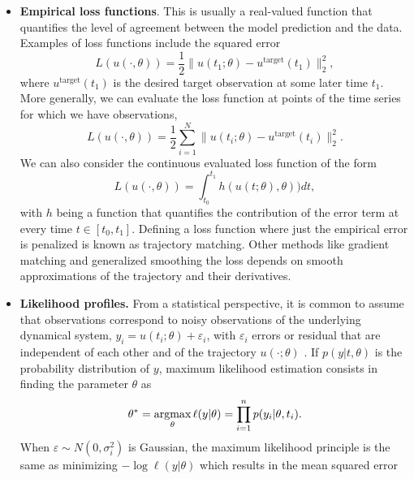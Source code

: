 \begin{itemize}
    \item \textbf{Empirical loss functions}. This is usually a real-valued function that quantifies the level of agreement between the model prediction and the data. Examples of loss functions include the squared error
    \begin{equation}
         L(u(\cdot, \theta)) = \frac{1}{2} \| u(t_1; \theta) - u^{\text{target}}(t_1) \|_2^2,
         \label{eq:quadratic-loss-function}
    \end{equation}
    where $u^{\text{target}}(t_1)$ is the desired target observation at some later time $t_1$.
    More generally, we can evaluate the loss function at points of the time series for which we have observations, 
    \begin{equation}
        L(u(\cdot, \theta)) = \frac{1}{2} \sum_{i=1}^N \| u(t_i; \theta) - u^{\text{target}}(t_i) \|_2^2.
    \end{equation}
    We can also consider the continuous evaluated loss function of the form
    \begin{equation}
         L(u(\cdot, \theta)) = \int_{t_0}^{t_1} h( u(t;\theta), \theta) ) dt, 
    \end{equation}
    with $h$ being a function that quantifies the contribution of the error term at every time $t \in [t_0, t_1]$. 
    Defining a loss function where just the empirical error is penalized is known as trajectory matching. 
    Other methods like gradient matching and generalized smoothing the loss depends on smooth approximations of the trajectory and their derivatives. 
    \item \textbf{Likelihood profiles.} From a statistical perspective, it is common to assume that observations correspond to noisy observations of the underlying dynamical system, $y_i = u(t_i; \theta) + \varepsilon_i$, with $\varepsilon_i$ errors or residual that are independent of each other and of the trajectory $u(\cdot ; \theta)$ \cite{ramsay2017dynamic}.
    If $p(y | t , \theta)$ is the probability distribution of $y$, maximum likelihood estimation consists in finding the parameter $\theta$ as
    \begin{equation}
        \theta^* 
        = 
        \underset{\theta}{\text{argmax}} \, \ell (y | \theta) 
        = 
        \prod_{i=1}^n p(y_i | \theta, t_i) .
    \end{equation}
    When $\varepsilon \sim N(0, \sigma_i^2)$ is Gaussian, the maximum likelihood principle is the same as minimizing $- \log \ell(y | \theta)$ which results in the mean squared error

\end{itemize}
